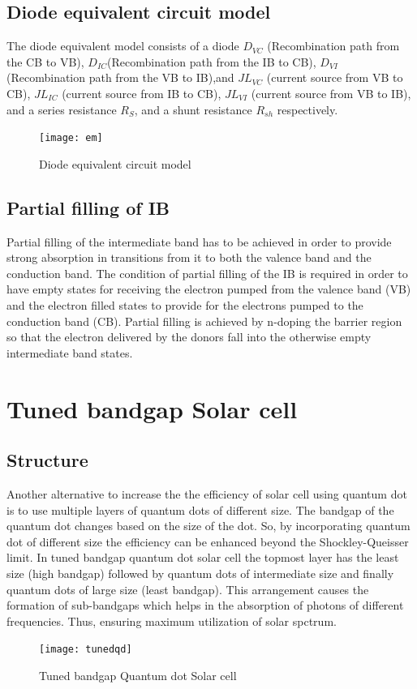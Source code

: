 \documentclass[hidelinks, 12pt]{report}
\begin{document}
\subsection{Diode equivalent circuit model}
The diode equivalent model consists of a diode $D_{VC}$ (Recombination path from the CB to VB), $D_{IC}$(Recombination path from the IB to CB), $D_{VI}$ (Recombination path from the VB to IB),and $JL_{VC}$ 
(current source from VB to CB), $JL_{IC}$ (current source from IB to CB), $JL_{VI}$ (current source from VB to IB), and a series resistance $R_S$, and a shunt resistance $R_{sh}$ respectively. \\ 
\begin{figure}[H]
\centering
\texttt{[image: em]}
\caption[Diode equivalent circuit model]{Diode equivalent circuit model \cite{em}}
\label{Diode Equivalent}
\end{figure}
\subsection{Partial filling of IB}
Partial filling of the intermediate band has to be achieved in order to provide strong absorption in transitions from it to both the valence band and the conduction band. The condition of partial filling of the IB is required in order to have empty states for receiving the electron pumped from the valence band (VB) and the electron filled states to provide for the electrons pumped to the conduction band (CB). Partial filling is achieved by n-doping the barrier region so that the electron delivered by the donors fall into the otherwise empty intermediate band states. \cite{pf}\\

\section{Tuned bandgap Solar cell}
\subsection{Structure}
Another alternative to increase the the efficiency of solar cell using quantum dot is to use multiple layers of quantum dots of different size.  The bandgap of the quantum dot changes based on the size of the dot. So, by incorporating quantum dot of different size the efficiency can be enhanced beyond the Shockley-Queisser limit.
In tuned bandgap quantum dot solar cell the topmost layer has the least size (high bandgap) followed by quantum dots of intermediate size and finally quantum dots of large size (least bandgap). This arrangement causes the formation of sub-bandgaps which helps in the absorption of photons of different frequencies. Thus, ensuring  maximum utilization of solar spctrum.
\begin{figure}[H]
\centering
\texttt{[image: tunedqd]}
\caption[Tuned bandgap Quantum dot Solar cell]{Tuned bandgap Quantum dot Solar cell \cite{multi}}
\label{Tuned bandgap Quantum dot Solar cell}
\end{figure}
\end{document}
